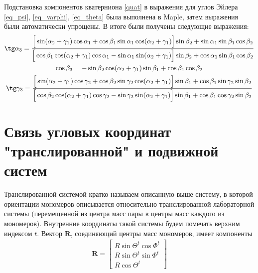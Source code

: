 \documentclass[14pt]{extarticle}
\newcommand{\vR}{\mathbf{R}}
\begin{document}
Подстановка компонентов кватерниона \eqref{quat} в выражения для углов Эйлера \eqref{eq_psi}, \eqref{eq_varphi}, \eqref{eq_theta} была выполнена в Maple, затем выражения были автоматически упрощены. В итоге были получены следующие выражения:
\begin{gather}
		\tg \alpha_3 = \frac{\Big[ \sin (\alpha_2 + \gamma_1) \cos \alpha_1 + \cos \beta_1 \sin \alpha_1 \cos (\alpha_2 + \gamma_1) \Big] \sin \beta_2 + \sin \alpha_1 \sin \beta_1 \cos \beta_2}{\Big[ \cos \beta_1 \cos (\alpha_2 + \gamma_1) \cos \alpha_1 - \sin \alpha_1 \sin(\alpha_2 + \gamma_1) \Big] \sin \beta_2 + \cos \alpha_1 \sin \beta_1 \cos \beta_2} \label{res1} \\
		\cos \beta_3 = - \sin \beta_2 \cos (\alpha_2 + \gamma_1 ) \sin \beta_1 + \cos \beta_1 \cos \beta_2 \label{res2} \\
		\tg \gamma_3 = \frac{\Big[ \sin (\alpha_2 + \gamma_1) \cos \gamma_2 + \cos \beta_2 \sin \gamma_2 \cos (\alpha_2 + \gamma_1) \Big] \sin \beta_1 + \cos \beta_1 \sin \gamma_2 \sin \beta_2}{\Big[ \cos \beta_2 \cos (\alpha_2 + \gamma_1) \cos \gamma_2 - \sin \gamma_2 \sin (\alpha_2 + \gamma_1) \Big] \sin \beta_1 + \cos \beta_1 \cos \gamma_2 \sin \beta_2} \label{res3} 
\end{gather}

\section*{Связь угловых координат "транслированной" и подвижной систем}

Транслированной системой кратко называем описанную выше систему, в которой ориентации мономеров описывается относительно транслированной лабораторной системы (перемещенной из центра масс пары в центры масс каждого из мономеров). Внутренние координаты такой системы будем помечать верхним индексом $t$. Вектор $\vR$, соединяющий центры масс мономеров, имеет компоненты
\begin{gather}
	\vR = \begin{bmatrix}
		R \sin \Theta^t \cos \Phi^t \\
		R \sin \Theta^t \sin \Phi^t \\
		R \cos \Theta^t
	\end{bmatrix}
\end{gather}
\end{document}
